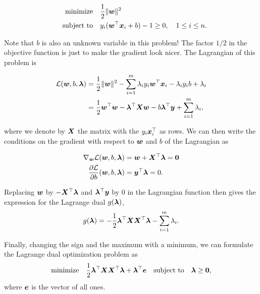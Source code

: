 \begin{align*}
\text{minimize}\quad & \frac{1}{2}\Vert {\bm{w}}\Vert^2\\
\quad\text{subject to}\quad & y_i(\bm{w}^{\top}\bm{x}_i+b)-1 \geq 0, \quad 1\leq i\leq n.
\end{align*}

Note that $b$ is also an unknown variable in this problem! 
The factor $1/2$ in the objective function is just to make the gradient look nicer. The Lagrangian of this problem is

\begin{align*}
\mathcal{L}(\bm{w},b,\bm{\lambda}) &= \frac{1}{2}\Vert {\bm{w}}\Vert^2 - \sum_{i=1}^m \lambda_i y_i \bm{w}^{\top}\bm{x}_i-\lambda_iy_ib+\lambda_i\\
&= \frac{1}{2}\bm{w}^{\top}\bm{w}-\bm{\lambda}^{\top}\bm{X}\bm{w}-b\bm{\lambda}^{\top}\bm{y}+\sum_{i=1}^m \lambda_i,
\end{align*}
 
where we denote by $\bm{X}$ the matrix with the $y_i\bm{x}_i^{\top}$ as rows. We can then write the conditions on the gradient with respect to $\bm{w}$ and $b$ of the Lagrangian as

\begin{align}\label{eq:lagrange-grad}
\begin{split}
 \nabla_{\bm{w}} \mathcal{L}(\bm{w},b,\bm{\lambda}) & = \bm{w}+\bm{X}^{\top}\bm{\lambda} = \bm{0} \\
 \frac{\partial \mathcal{L}}{\partial b}(\bm{w},b,\bm{\lambda}) &= \bm{y}^{\top}\bm{\lambda} = 0.
 \end{split}
\end{align}

Replacing $\bm{w}$ by $-\bm{X}^{\top}\bm{\lambda}$ and $\bm{\lambda}^{\top}\bm{y}$ by $0$ in the Lagrangian function then gives the expression for the Lagrange dual $g(\bm{\lambda})$,
\begin{equation*}
  g(\bm{\lambda}) = -\frac{1}{2}\bm{\lambda}^{\top}\bm{X}\bm{X}^{\top}\bm{\lambda}-\sum_{i=1}^m \lambda_i.
\end{equation*}

Finally, changing the sign and the maximum with a minimum, we can formulate the Lagrange dual optimization problem as
\begin{equation}\label{eq:svm-dual}
\text{minimize}\quad \frac{1}{2}\bm{\lambda}^{\top}\bm{X}\bm{X}^{\top}\bm{\lambda}+ \bm{\lambda}^{\top}\bm{e} \quad\text{subject to}\quad \bm{\lambda}\geq \bm{0},
\end{equation}
where $\bm{e}$ is the vector of all ones. 

